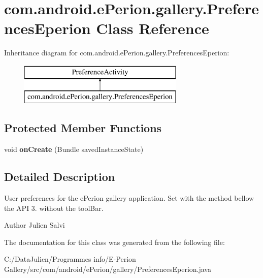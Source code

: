 \section{com.\-android.\-e\-Perion.\-gallery.\-Preferences\-Eperion Class Reference}
\label{classcom_1_1android_1_1e_perion_1_1gallery_1_1_preferences_eperion}
Inheritance diagram for com.\-android.\-e\-Perion.\-gallery.\-Preferences\-Eperion\-:\begin{figure}[H]
\begin{center}
\leavevmode
\includegraphics[height=2.000000cm]{classcom_1_1android_1_1e_perion_1_1gallery_1_1_preferences_eperion}
\end{center}
\end{figure}
\subsection*{Protected Member Functions}
\begin{DoxyCompactItemize}
\item 
void {\bfseries on\-Create} (Bundle saved\-Instance\-State)\label{classcom_1_1android_1_1e_perion_1_1gallery_1_1_preferences_eperion_afc54f014aeb9bd1b2fef88bd53b04510}

\end{DoxyCompactItemize}


\subsection{Detailed Description}
User preferences for the e\-Perion gallery application. Set with the method bellow the A\-P\-I 3. without the tool\-Bar. \begin{DoxyAuthor}{Author}
Julien Salvi 
\end{DoxyAuthor}


The documentation for this class was generated from the following file\-:\begin{DoxyCompactItemize}
\item 
C\-:/\-Data\-Julien/\-Programmes info/\-E-\/\-Perion Gallery/src/com/android/e\-Perion/gallery/Preferences\-Eperion.\-java\end{DoxyCompactItemize}
